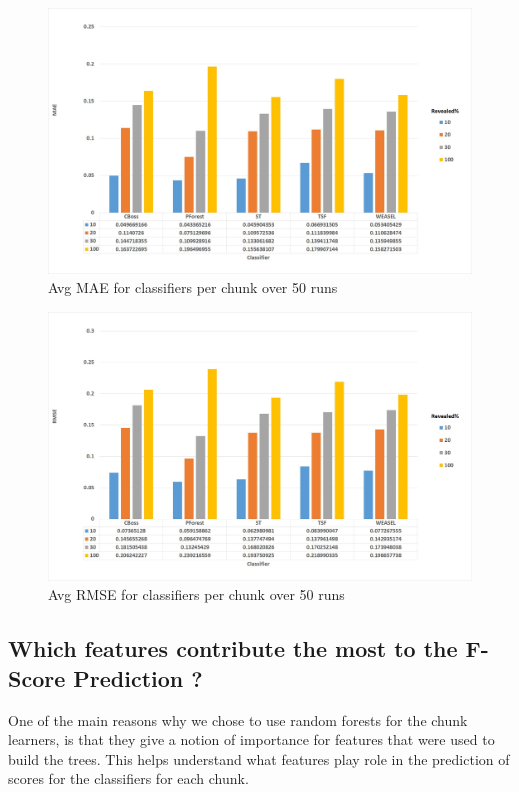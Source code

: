   \begin{figure}[hbt!]
    \captionsetup{justification=raggedright}
    \centering
    \includegraphics[width=\textwidth]{MAE_classifier.JPG}
    \centering
    \caption{Avg MAE for classifiers per chunk over 50 runs}
    \label{Img:MAEClassifier}
  \end{figure}

  \begin{figure}[hbt!]
    \captionsetup{justification=raggedright}
    \centering
    \includegraphics[width=\textwidth]{RMSE_classifier.JPG}
    \centering
    \caption{Avg RMSE for classifiers per chunk over 50 runs}
    \label{Img:RMSEClassifier}
  \end{figure}

\subsection{Which features contribute the most to the F-Score Prediction ?}
\label{SubsectionFeature}
One of the main reasons why we chose to use random forests for the chunk learners, is that they give a notion of importance for features that were used to build the trees.
This helps understand what features play role in the prediction of scores for the classifiers for each chunk.

